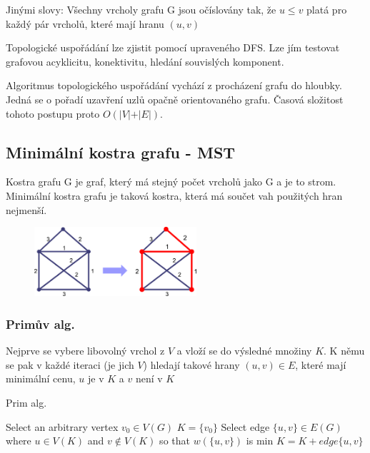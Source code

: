 Jinými slovy: Všechny vrcholy grafu G jsou očíslovány tak, že $u\leq v$ platá pro každý pár vrcholů, které mají hranu $(u,v)$

Topologické uspořádání lze zjistit pomocí upraveného DFS. Lze jím testovat grafovou acyklicitu, konektivitu, hledání souvislých komponent.

Algoritmus topologického uspořádání vychází z procházení grafu do hloubky. Jedná se o pořadí uzavření uzlů opačně orientovaného grafu. Časová složitost tohoto postupu proto $O(\vert V \vert + \vert E \vert)$.

\subsection{Minimální kostra grafu - MST}
Kostra grafu G je graf, který má stejný počet vrcholů jako G a je to strom. Minimální kostra grafu je taková kostra, která má součet vah použitých hran nejmenší.

\begin{figure}[h]
    \begin{center}
        \includegraphics[width=60mm]{02/images/spanning-tree}
    \end{center}
\end{figure}

\vspace{-10px}

\subsubsection{Primův alg.}
Nejprve se vybere libovolný vrchol z $V$ a vloží se do výsledné množiny $K$. K němu se pak v každé iteraci (je jich $V$) hledají takové hrany $(u,v) \in E$, které mají minimální cenu, $u$ je v $K$ a $v$ není v $K$

\begin{algorithm}
\caption{Prim alg.}
\begin{algorithmic}
\State Select an arbitrary vertex $v_0 \in V(G)$
\State $K = \{v_0\}$
  \State Select edge $\{u,v\} \in E(G)$ where $u \in V(K)$ and $v \notin V(K)$ so that $w(\{u,v\})$ is min
  \State $K = K + edge\{u,v\}$
\EndWhile
\end{algorithmic}
\end{algorithm}

